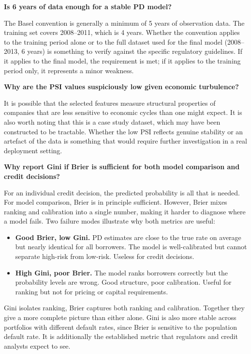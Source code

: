 \documentclass[a4paper,11pt]{article}
\begin{document}
\textbf{Is 6 years of data enough for a stable PD model?}

The Basel convention is generally a minimum of 5 years of observation data.
The training set covers 2008--2011, which is 4 years. Whether the convention
applies to the training period alone or to the full dataset used for the final
model (2008--2013, 6 years) is something to verify against the specific
regulatory guidelines. If it applies to the final model, the requirement is met;
if it applies to the training period only, it represents a minor weakness.

\textbf{Why are the PSI values suspiciously low given economic turbulence?}

It is possible that the selected features measure structural properties of
companies that are less sensitive to economic cycles than one might expect.
It is also worth noting that this is a case study dataset, which may have been
constructed to be tractable. Whether the low PSI reflects genuine stability or
an artefact of the data is something that would require further investigation
in a real deployment setting.

\textbf{Why report Gini if Brier is sufficient for both model comparison and credit decisions?}

For an individual credit decision, the predicted probability is all that is needed.
For model comparison, Brier is in principle sufficient. However, Brier mixes ranking
and calibration into a single number, making it harder to diagnose where a model
fails. Two failure modes illustrate why both metrics are useful:

\begin{itemize}[leftmargin=1.5em]
  \item \textbf{Good Brier, low Gini.} PD estimates are close to the true rate on
        average but nearly identical for all borrowers. The model is well-calibrated
        but cannot separate high-risk from low-risk. Useless for credit decisions.
  \item \textbf{High Gini, poor Brier.} The model ranks borrowers correctly but the
        probability levels are wrong. Good structure, poor calibration. Useful for
        ranking but not for pricing or capital requirements.
\end{itemize}

Gini isolates ranking, Brier captures both ranking and calibration. Together they
give a more complete picture than either alone. Gini is also more stable across
portfolios with different default rates, since Brier is sensitive to the population
default rate. It is additionally the established metric that regulators and credit
analysts expect to see.
\end{document}
